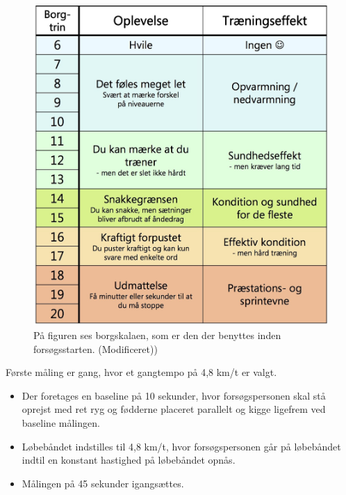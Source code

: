 \begin{figure}[H]
	\centering
	\includegraphics[scale=0.5]{figures/qBilag/Borg-skala.jpg}
	\caption{På figuren ses borgskalaen, som er den der benyttes inden forsøgsstarten. (Modificeret)\cite{Patientinformationen2013})}
	\label{fig:borgskala}
\end{figure}

Første måling er gang, hvor et gangtempo på 4,8 km/t er valgt\citep{Miles2007}. \vspace{-3mm}
\begin{itemize}
	\item Der foretages en baseline på 10 sekunder, hvor forsøgspersonen skal stå oprejst med ret ryg og fødderne placeret parallelt og kigge ligefrem ved baseline målingen.
	\item Løbebåndet indstilles til 4,8 km/t, hvor forsøgspersonen går på løbebåndet indtil en konstant hastighed på løbebåndet opnås. 
	\item Målingen på 45 sekunder igangsættes.
\end{itemize}

